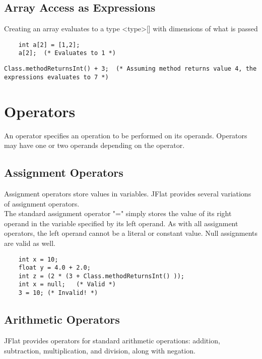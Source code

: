 \begin{homeworkProblem}
	\subsection{Array Access as Expressions}
	Creating an array evaluates to a type \textless type\textgreater[] with dimensions of what is passed
	\begin{verbatim}
	int a[2] = [1,2];
	a[2];  (* Evaluates to 1 *)
	\end{verbatim}
	
	
	\begin{verbatim}
Class.methodReturnsInt() + 3;  (* Assuming method returns value 4, the expressions evaluates to 7 *)
	\end{verbatim}
	
	\section{Operators}
		
	An operator specifies an operation to be performed on its operands. Operators may have one or two operands depending on the operator. 
	
	\subsection{Assignment Operators}
		
	Assignment operators store values in variables. JFlat provides several variations of assignment operators.\\
		
	The standard assignment operator "=" simply stores the value of its right operand in the variable specified by its left operand. As with all assignment operators, the left operand cannot be a literal or constant value. Null assignments are valid as well.
		
	\begin{verbatim}
	int x = 10;
	float y = 4.0 + 2.0;
	int z = (2 * (3 + Class.methodReturnsInt() ));
	int x = null;   (* Valid *)
	3 = 10; (* Invalid! *)
	\end{verbatim}
	
	\subsection{Arithmetic Operators}
	
	JFlat provides operators for standard arithmetic operations: addition, subtraction, multiplication, and division, along with negation.
	

\end{homeworkProblem}
